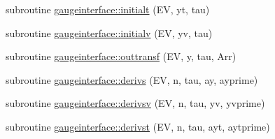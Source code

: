 \begin{DoxyCompactItemize}
\item 
subroutine \mbox{\hyperlink{namespacegaugeinterface_afbc0a211756e4b923725483b6c961e75}{gaugeinterface\+::initialt}} (EV, yt, tau)
\item 
subroutine \mbox{\hyperlink{namespacegaugeinterface_aeed464df3ecab21d57bcb789fe3b1a22}{gaugeinterface\+::initialv}} (EV, yv, tau)
\item 
subroutine \mbox{\hyperlink{namespacegaugeinterface_ae920635485c908177072c6cad0d49f59}{gaugeinterface\+::outtransf}} (EV, y, tau, Arr)
\item 
subroutine \mbox{\hyperlink{namespacegaugeinterface_a1d317261c83f3b5e84fe401ac2436d44}{gaugeinterface\+::derivs}} (EV, n, tau, ay, ayprime)
\item 
subroutine \mbox{\hyperlink{namespacegaugeinterface_a25ee0c9e055aabce6b7eb205e65f9804}{gaugeinterface\+::derivsv}} (EV, n, tau, yv, yvprime)
\item 
subroutine \mbox{\hyperlink{namespacegaugeinterface_ab2ff4cd74364457862a7ff44fb2ca978}{gaugeinterface\+::derivst}} (EV, n, tau, ayt, aytprime)
\end{DoxyCompactItemize}
